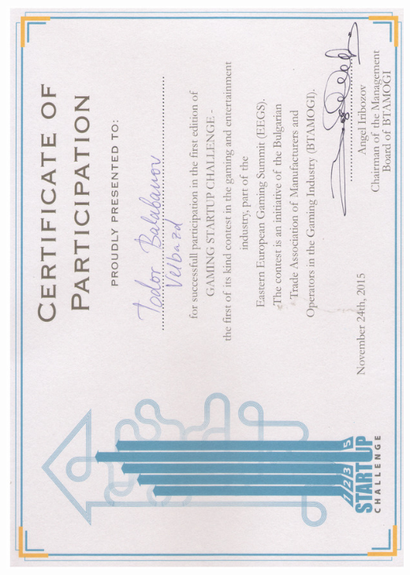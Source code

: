 \documentclass[bulgarian,a4paper]{europasscv}
\begin{document}
\includegraphics[width=\textwidth,height=\textheight,keepaspectratio]{EEGS2015}
\end{document}
